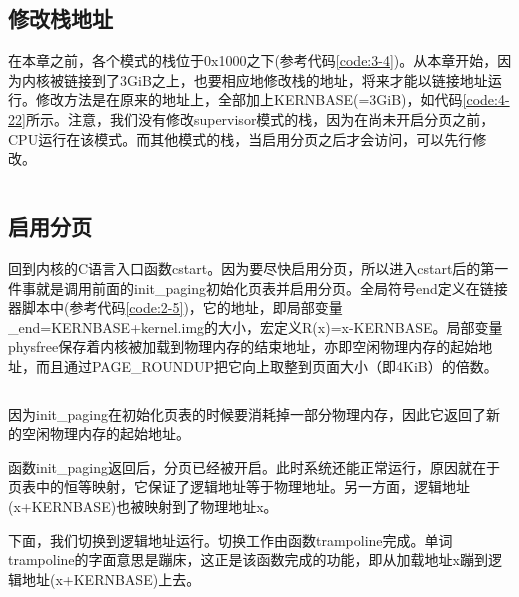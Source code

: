 \documentclass[main.tex]{subfiles}
\begin{document}
\begin{CJK*}{UTF8}{song}
\subsection{修改栈地址}
在本章之前，各个模式的栈位于0x1000之下(参考代码\ref{code:3-4})。从本章开始，因为内核被链接到了3GiB之上，也要相应地修改栈的地址，将来才能以链接地址运行。修改方法是在原来的地址上，全部加上KERNBASE(=3GiB)，如代码\ref{code:4-22}所示。注意，我们没有修改supervisor模式的栈，因为在尚未开启分页之前，CPU运行在该模式。而其他模式的栈，当启用分页之后才会访问，可以先行修改。

\begin{code}
\label{code:4-22}
\inputminted[firstline=127,lastline=144,linenos,numbersep=5pt,frame=lines,framesep=2mm]{gas}{src/chapter04/kernel/entry.S}
\end{code}

\subsection{启用分页}
回到内核的C语言入口函数cstart。因为要尽快启用分页，所以进入cstart后的第一件事就是调用前面的init\_paging初始化页表并启用分页。全局符号end定义在链接器脚本中(参考代码\ref{code:2-5})，它的地址，即局部变量\_end=KERNBASE+kernel.img的大小，宏定义R(x)=x-KERNBASE。局部变量physfree保存着内核被加载到物理内存的结束地址，亦即空闲物理内存的起始地址，而且通过PAGE\_ROUNDUP把它向上取整到页面大小（即4KiB）的倍数。

\begin{code}
\label{code:4-23}
\inputminted[firstline=339,lastline=347,linenos,numbersep=5pt,frame=lines,framesep=2mm]{c}{src/chapter04/kernel/machdep.c}
\end{code}

因为init\_paging在初始化页表的时候要消耗掉一部分物理内存，因此它返回了新的空闲物理内存的起始地址。

\par
函数init\_paging返回后，分页已经被开启。此时系统还能正常运行，原因就在于页表中的恒等映射，它保证了逻辑地址等于物理地址。另一方面，逻辑地址(x+KERNBASE)也被映射到了物理地址x。

\par
下面，我们切换到逻辑地址运行。切换工作由函数trampoline完成。单词trampoline的字面意思是蹦床，这正是该函数完成的功能，即从加载地址x蹦到逻辑地址(x+KERNBASE)上去。

\begin{code}
\label{code:4-24}
\inputminted[firstline=349,lastline=352,linenos,numbersep=5pt,frame=lines,framesep=2mm]{c}{src/chapter04/kernel/machdep.c}
\end{code}


\end{CJK*}
\end{document}
